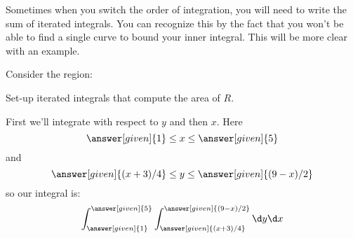 \documentclass{ximera}
\begin{document}
Sometimes when you switch the order of integration, you will need to
write the sum of iterated integrals. You can recognize this by the
fact that you won't be able to find a single curve to bound your inner
integral. This will be more clear with an example.

\begin{example}
  Consider the region:
  \begin{image}
  \end{image}
  Set-up iterated integrals that compute the area of $R$.
  \begin{explanation}
    First we'll integrate with respect to $y$ and then $x$. Here
    \[
    \answer[given]{1}\le x \le \answer[given]{5}
    \]
    and
    \[
    \answer[given]{(x+3)/4}\le y \le \answer[given]{(9-x)/2}
    \]
    so our integral is:
    \[
    \int_{\answer[given]{1}}^{\answer[given]{5}} \int_{\answer[given]{(x+3)/4}}^{\answer[given]{(9-x)/2}}\d y \d x
    \]
  

\end{explanation}
\end{example}
\end{document}
